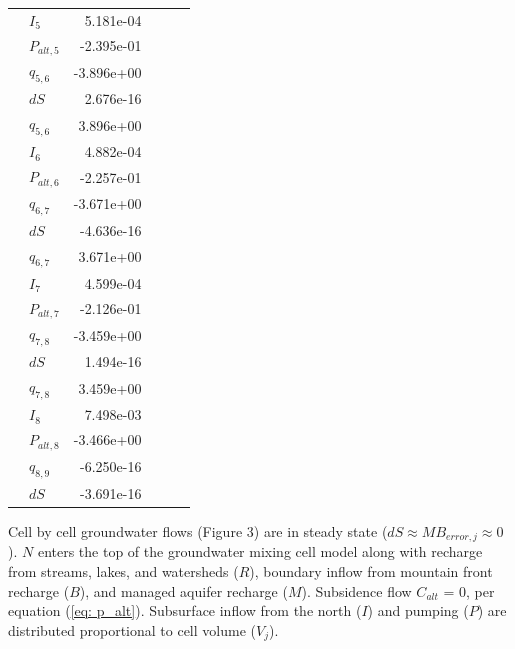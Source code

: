\begin{threeparttable}
\begin{table}[H]
{\begin{tabular}{rlrrrr}
			& $I_5$ & 5.181e-04 \\ 
			& $P_{alt, 5}$ & -2.395e-01 \\ 
			& $q_{5,6}$ & -3.896e+00 \\ 
			& $dS$ & 2.676e-16 \\ 
			\hline
			\parbox[t]{2mm}{}
			& $q_{5,6}$ & 3.896e+00 \\ 
			& $I_6$ & 4.882e-04 \\ 
			& $P_{alt, 6}$ & -2.257e-01 \\ 
			& $q_{6,7}$ & -3.671e+00 \\ 
			& $dS$ & -4.636e-16 \\ 
			\hline
			\parbox[t]{2mm}{}
			& $q_{6,7}$ & 3.671e+00 \\ 
			& $I_7$ & 4.599e-04 \\ 
			& $P_{alt, 7}$ & -2.126e-01 \\ 
			& $q_{7,8}$ & -3.459e+00 \\ 
			& $dS$ & 1.494e-16 \\ 
			\hline
			\parbox[t]{2mm}{}
			& $q_{7,8}$ & 3.459e+00 \\ 
			& $I_8$ & 7.498e-03 \\ 
			& $P_{alt, 8}$ & -3.466e+00 \\ 
			& $q_{8,9}$ & -6.250e-16 \\ 
			& $dS$ & -3.691e-16 \\ 
			\hline
			
		\end{tabular}
	}
		Cell by cell groundwater flows (Figure 3) are in steady state ($dS \approx MB_{error, j} \approx 0$). $N$ enters the top of the groundwater mixing cell model along with recharge from streams, lakes, and watersheds ($R$), boundary inflow from mountain front recharge ($B$), and managed aquifer recharge ($M$). Subsidence flow $C_{alt}$ = 0, per equation (\ref{eq: p_alt}). Subsurface inflow from the north ($I$) and pumping ($P$) are distributed proportional to cell volume ($V_j$). 
		
		\label{ap_b_cbc}
	\end{table}

\end{threeparttable}






